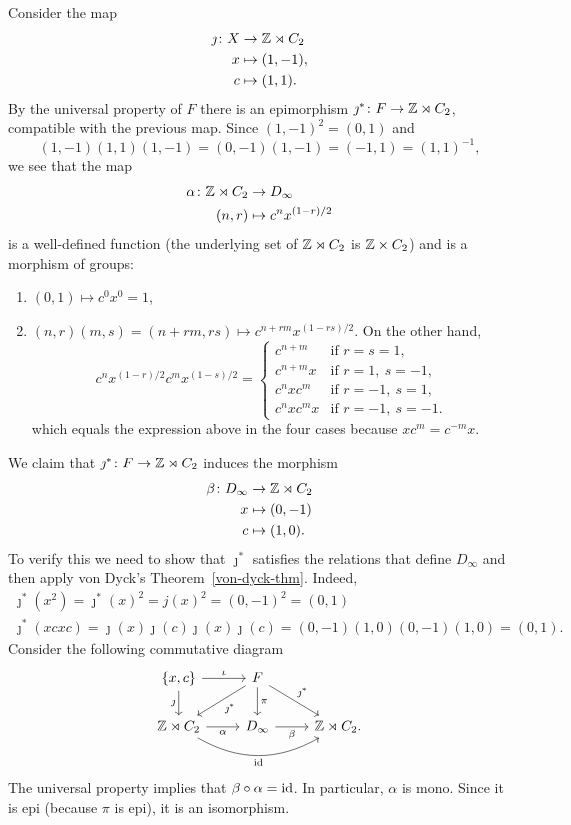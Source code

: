 Consider the map
\begin{align*}
    \jmath\colon X&\to\mathbb{Z}\rtimes C_2\\
    x&\mapsto (1,-1),\\
    c&\mapsto (1,1).
\end{align*}
By the universal property of $F$ there is an epimorphism $\jmath^*\colon F\to\mathbb{Z}\rtimes C_2$, compatible with the previous map. Since $(1,-1)^2=(0,1)$ and
$$
    (1,-1)(1,1)(1,-1)=(0,-1)(1,-1)=(-1,1)=(1,1)^{-1},
$$
we see that the map
\begin{align*}
    \alpha\colon\mathbb{Z}\rtimes C_2&\to D_\infty\\
    (n,r)&\mapsto c^nx^{(1-r)/2}
\end{align*}
is a well-defined function (the underlying set of\/ $\mathbb{Z}\rtimes C_2$ is\/ $\mathbb{Z}\times C_2$) and is a morphism of groups:
\begin{enumerate}[\upshape-]
    \item $(0,1)\mapsto c^0x^0=1$,
    \item $(n,r)(m,s)=(n+rm,rs)\mapsto c^{n+rm}x^{(1-rs)/2}$. On the other hand,
    $$
        c^nx^{(1-r)/2}c^mx^{(1-s)/2}
            = \begin{cases}
                c^{n+m}     &\text{if }r=s=1,\\
                c^{n+m}x  &\text{if }r=1,\ s=-1,\\
                c^nxc^m     &\text{if }r=-1,\ s=1,\\
                c^nxc^mx    &\text{if }r=-1,\ s=-1.
            \end{cases}
    $$
    which equals the expression above in the four cases because $xc^m=c^{-m}x$.
\end{enumerate}
We claim that $\jmath^*\colon F\to\mathbb{Z}\rtimes C_2$ induces the morphism
\begin{align*}
    \beta\colon D_\infty&\to\mathbb{Z}\rtimes C_2\\
    x&\mapsto(0,-1)\\
    c&\mapsto(1,0).
\end{align*}
To verify this we need to show that\/ $\jmath^*$ satisfies the relations that define\/ $D_\infty$ and then apply von Dyck's Theorem~\ref{von-dyck-thm}. Indeed,
\begin{gather*}
    \jmath^*(x^2) = \jmath^*(x)^2=j(x)^2=(0,-1)^2=(0,1)\\
    \jmath^*(xcxc) = \jmath(x)\jmath(c)\jmath(x)\jmath(c)
        =(0,-1)(1,0)(0,-1)(1,0)=(0,1).
\end{gather*}
Consider the following commutative diagram
$$
\begin{tikzcd}
    {\set{x,c}}
            \arrow[r,"\iota"]
            \arrow[d,"\jmath"']
        &F
            \arrow[d,"\pi"]
            \arrow[ld,"\jmath^*"]
            \arrow[rd,"\jmath^*"]\\
    \Z\rtimes C_2
            \arrow[r,"\alpha"']
            \arrow[rr,"\id"',bend right]
        &D_\infty
            \arrow[r,"\beta"']
        &\Z\rtimes C_2.
\end{tikzcd}
$$
The universal property implies that $\beta\circ\alpha=\operatorname{id}$. In particular, $\alpha$ is mono. Since it is epi (because $\pi$ is epi), it is an isomorphism.

